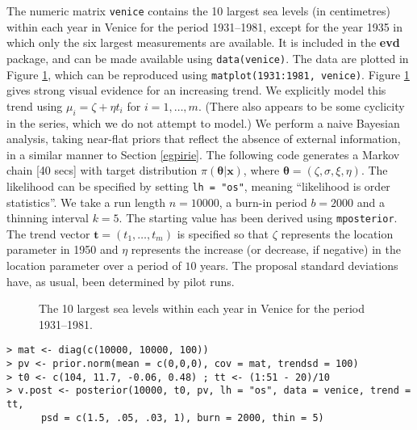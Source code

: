 \documentclass[11pt,a4paper]{article}
\newcommand{\bs}{\boldsymbol}
\begin{document}
The numeric matrix \verb+venice+ contains the 10 largest sea levels (in centimetres) within each year in Venice for the period 1931--1981, except for the year 1935 in which only the six largest measurements are available.   
It is included in the \textbf{evd} package, and can be made available using \verb+data(venice)+. 
The data are plotted in Figure \ref{vendata}, which can be reproduced using \verb+matplot(1931:1981, venice)+.
Figure \ref{vendata} gives strong visual evidence for an increasing trend.
We explicitly model this trend using $\mu_i = \zeta + \eta t_i$ for $i=1,\dots,m$.
(There also appears to be some cyclicity in the series, which we do not attempt to model.)
We perform a naive Bayesian analysis, taking near-flat priors that reflect the absence of external information, in a similar manner to Section \ref{egpirie}.  
The following code generates a Markov chain [40 secs] with target distribution $\pi(\bs{\theta}|\bs{x})$, where $\bs{\theta} = (\zeta,\sigma,\xi,\eta)$.
The likelihood can be specified by setting \verb+lh = "os"+, meaning ``likelihood is order statistics''.
We take a run length $n=10000$, a burn-in period $b=2000$ and a thinning interval $k=5$.
The starting value has been derived using \verb+mposterior+.
The trend vector $\bs{t} = (t_1,\dots,t_m)$ is specified so that $\zeta$ represents the location parameter in 1950 and $\eta$ represents the increase (or decrease, if negative) in the location parameter over a period of $10$ years.
The proposal standard deviations have, as usual, been determined by pilot runs.

\begin{figure}
\begin{center}
\vspace{-1.5cm}
\end{center}
\caption{The 10 largest sea levels within each year in Venice for the period 1931--1981.}
\label{vendata}
\end{figure}

\begin{verbatim}
> mat <- diag(c(10000, 10000, 100))
> pv <- prior.norm(mean = c(0,0,0), cov = mat, trendsd = 100)
> t0 <- c(104, 11.7, -0.06, 0.48) ; tt <- (1:51 - 20)/10
> v.post <- posterior(10000, t0, pv, lh = "os", data = venice, trend = tt, 
      psd = c(1.5, .05, .03, 1), burn = 2000, thin = 5)
\end{verbatim}
\end{document}
